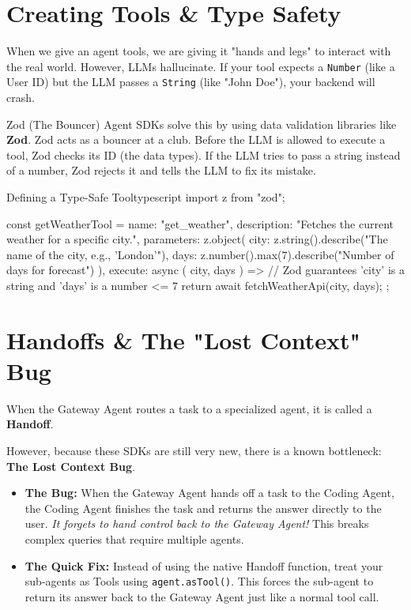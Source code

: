 \documentclass[12pt,a4paper,oneside]{book}
\begin{document}
\section{Creating Tools \& Type Safety}
When we give an agent tools, we are giving it "hands and legs" to interact with the real world. However, LLMs hallucinate. If your tool expects a \texttt{Number} (like a User ID) but the LLM passes a \texttt{String} (like "John Doe"), your backend will crash.

\begin{concept}{Zod (The Bouncer)}
	Agent SDKs solve this by using data validation libraries like \textbf{Zod}. Zod acts as a bouncer at a club. Before the LLM is allowed to execute a tool, Zod checks its ID (the data types). If the LLM tries to pass a string instead of a number, Zod rejects it and tells the LLM to fix its mistake.
\end{concept}

\begin{codeblock}{Defining a Type-Safe Tool}{typescript}
import { z } from "zod";

const getWeatherTool = {
    name: "get_weather",
    description: "Fetches the current weather for a specific city.",
    parameters: z.object({
        city: z.string().describe("The name of the city, e.g., 'London'"),
        days: z.number().max(7).describe("Number of days for forecast")
    }),
    execute: async ({ city, days }) => {
        // Zod guarantees 'city' is a string and 'days' is a number <= 7
        return await fetchWeatherApi(city, days);
    }
};
\end{codeblock}

\section{Handoffs \& The "Lost Context" Bug}
When the Gateway Agent routes a task to a specialized agent, it is called a \textbf{Handoff}.

However, because these SDKs are still very new, there is a known bottleneck: \textbf{The Lost Context Bug}.
\begin{itemize}
	\item \textbf{The Bug:} When the Gateway Agent hands off a task to the Coding Agent, the Coding Agent finishes the task and returns the answer directly to the user. \textit{It forgets to hand control back to the Gateway Agent!} This breaks complex queries that require multiple agents.
	\item \textbf{The Quick Fix:} Instead of using the native Handoff function, treat your sub-agents as Tools using \texttt{agent.asTool()}. This forces the sub-agent to return its answer back to the Gateway Agent just like a normal tool call.
\end{itemize}
\end{document}
